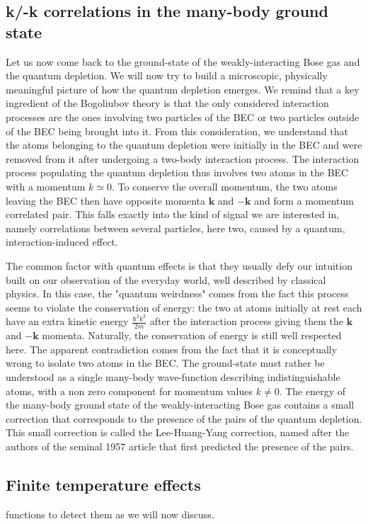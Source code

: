 \subsection{k/-k correlations in the many-body ground state}

Let us now come back to the ground-state of the weakly-interacting Bose gas and the quantum depletion. We will now try to build a microscopic, physically meaningful picture of how the quantum depletion emerges. We remind that a key ingredient of the Bogoliubov theory is that the only considered interaction processes are the ones involving two particles of the BEC or two particles outside of the BEC being brought into it. From this consideration, we understand that the atoms belonging to the quantum depletion were initially in the BEC and were removed from it after undergoing a two-body interaction process. The interaction process populating the quantum depletion thus involves two atoms in the BEC with a momentum $k \simeq 0$. To conserve the overall momentum, the two atoms leaving the BEC then have opposite momenta $\bm{k}$ and $-\bm{k}$ and form a momentum correlated pair. This falls exactly into the kind of signal we are interested in, namely correlations between several particles, here two, caused by a quantum, interaction-induced effect.

The common factor with quantum effects is that they usually defy our intuition built on our observation of the everyday world, well described by classical physics. In this case, the "quantum weirdness" comes from the fact this process seems to violate the conservation of energy: the two at atoms initially at rest each have an extra kinetic energy $\frac{\hbar^2 k^2}{2m}$ after the interaction process giving them the $\bm{k}$ and $-\bm{k}$ momenta. Naturally, the conservation of energy is still well respected here. The apparent contradiction comes from the fact that it is conceptually wrong to isolate two atoms in the BEC. The ground-state must rather be understood as a single many-body wave-function describing indistinguishable atoms, with a non zero component for momentum values $k \neq 0$. The energy of the many-body ground state of the weakly-interacting Bose gas contains a small correction that corresponds to the presence of the \kmk pairs of the quantum depletion. This small correction is called the Lee-Huang-Yang correction, named after the authors of the seminal 1957 article \cite{lee1957} that first predicted the presence of the \kmk pairs.

\subsection{Finite temperature effects} functions to detect them as we will now discuss.



